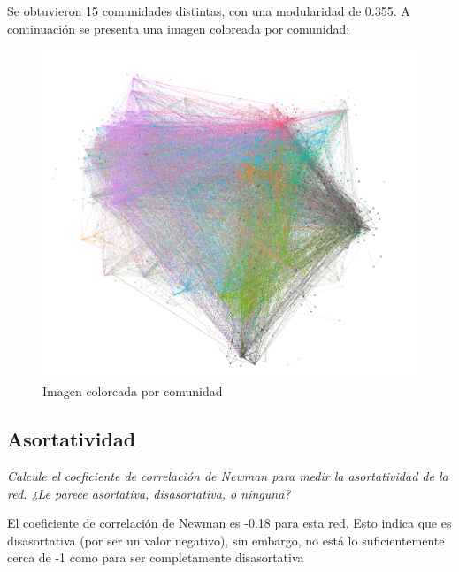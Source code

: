 \documentclass[12pt]{article}
\begin{document}
Se obtuvieron 15 comunidades distintas, con una modularidad de 0.355. A continuación se presenta una imagen coloreada por comunidad:

\begin{figure}[H]
    \begin{center}
        \includegraphics[scale=0.4]{images/red_comunidades.png}
    \end{center}
    \caption{Imagen coloreada por comunidad}
    \label{fig:drawing-community}
\end{figure}
\subsection{Asortatividad}
\textit{Calcule el coeficiente de correlación de Newman para medir la asortatividad de la red. ¿Le parece asortativa, disasortativa, o ninguna?}

El coeficiente de correlación de Newman es -0.18 para esta red. Esto indica que es disasortativa (por ser un valor negativo), sin embargo, no está lo suficientemente cerca de -1 como para ser completamente disasortativa
\end{document}
